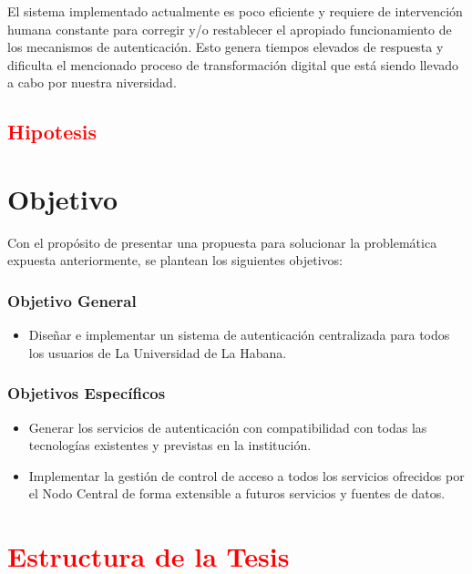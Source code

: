 El sistema implementado actualmente es poco eficiente y requiere de intervención humana constante para corregir y/o restablecer el apropiado funcionamiento de los mecanismos de autenticación. Esto genera tiempos elevados de respuesta y dificulta el mencionado proceso de transformación digital que está siendo llevado a cabo por nuestra niversidad.

\textcolor{red}{\section*{Hipotesis}}

\section*{Objetivo}
Con el propósito de presentar una propuesta para solucionar la problemática expuesta anteriormente, se plantean los siguientes objetivos:

\subsubsection*{Objetivo General}

\begin{itemize}	
	\item Diseñar e implementar un sistema de autenticación centralizada para todos los usuarios de La Universidad de La Habana. 
\end{itemize}

\subsubsection*{Objetivos Específicos}
\begin{itemize}	
	\item Generar los servicios de autenticación con compatibilidad con todas las tecnologías existentes y previstas en la institución.
	\item Implementar la gestión de control de acceso a todos los servicios ofrecidos por el Nodo Central de forma extensible a futuros servicios y fuentes de datos.
\end{itemize}

\section*{\textcolor{red}{Estructura de la Tesis}}
